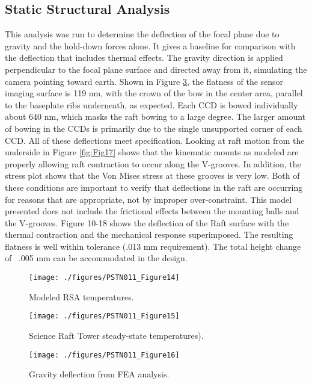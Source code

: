 \subsection{Static Structural Analysis}
This analysis was run to determine the deflection of the focal plane due to gravity and the hold-down forces alone. It gives a baseline for comparison with the deflection that includes thermal effects. The gravity direction is applied perpendicular to the focal plane surface and directed away from it, simulating the camera pointing toward earth.
Shown in Figure \ref{fig:Fig16}, the flatness of the sensor imaging surface is 119 nm, with the crown of the bow in the center area, parallel to the baseplate ribs underneath, as expected. Each CCD is bowed individually about 640 nm, which masks the raft bowing to a large degree. The larger amount of bowing in the CCDs is primarily due to the single unsupported corner of each CCD. All of these deflections meet specification.
Looking at raft motion from the underside in Figure \ref{fig:Fig17} shows that the kinematic mounts as modeled are properly allowing raft contraction to occur along the V-grooves. In addition, the stress plot shows that the Von Mises stress at these grooves is very low. Both of these conditions are important to verify that deflections in the raft are occurring for reasons that are appropriate, not by improper over-constraint. This model presented does not include the frictional effects between the mounting balls and the V-grooves.
Figure 10-18 shows the deflection of the Raft surface with the thermal contraction and the mechanical response superimposed. The resulting flatness is well within tolerance (.013 mm requirement). The total height change of ~.005 mm can be accommodated in the design.

\begin{figure}[htbp]
\begin{center}
\texttt{[image: ./figures/PSTN011\_Figure14]}
\caption{Modeled RSA temperatures.}
\label{fig:Fig14}
\end{center}
\end{figure}

\begin{figure}[htbp]
\begin{center}
\texttt{[image: ./figures/PSTN011\_Figure15]}
\caption{Science Raft Tower steady-state temperatures).}
\label{fig:Fig15}
\end{center}
\end{figure} 
 
\begin{figure}[htbp]
\begin{center}
\texttt{[image: ./figures/PSTN011\_Figure16]}
\caption{Gravity deflection from FEA analysis.}
\label{fig:Fig16}
\end{center}
\end{figure}

